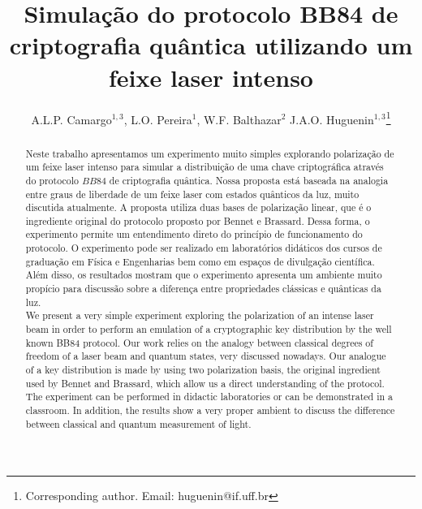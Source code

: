 \documentclass[pra, twocolumn]{revtex4}
\begin{document}
\title{Simula\c{c}\~ao do protocolo BB84 de criptografia qu\^antica utilizando um feixe laser intenso}

\author{A.L.P. Camargo$^{1,3}$, L.O. Pereira$^{1}$, W.F. Balthazar$^{2}$ J.A.O. Huguenin$^{1,3}$\footnote{Corresponding author. Email: huguenin@if.uff.br}}






\begin{abstract}

Neste trabalho apresentamos um experimento muito simples explorando polariza\c{c}\~ao de um feixe laser intenso para simular a distribui\c{c}\~ao de uma chave criptogr\'afica atrav\'es do protocolo $BB84$ de criptografia qu\^antica. Nossa proposta est\'a baseada na analogia entre graus de liberdade de um feixe laser com estados qu\^anticos da luz, muito discutida atualmente. A proposta utiliza duas bases de polariza\c{c}\~ao linear, que \'e o ingrediente original do protocolo proposto por Bennet e Brassard. Dessa forma, o experimento permite um entendimento direto do princ\'ipio de funcionamento do protocolo. O experimento pode ser realizado em laborat\'orios did\'aticos dos cursos de gradua\c{c}\~ao em F\'isica e Engenharias bem como em espa\c{c}os de divulga\c{c}\~ao cient\'ifica. Al\'em disso, os resultados mostram que o experimento apresenta um ambiente muito prop\'icio para discuss\~ao sobre a diferen\c{c}a entre propriedades cl\'assicas e qu\^anticas da luz.\\


We present a very simple experiment exploring the polarization of an intense laser beam in order to perform an emulation of a cryptographic key distribution by the well known BB84 protocol. Our work relies on the analogy between classical degrees of freedom of a laser beam and quantum states, very discussed nowadays. Our analogue of a key distribution is made by using two polarization basis, the original ingredient used by Bennet and Brassard, which allow us a direct understanding of the protocol. The experiment can be performed in didactic laboratories or can be demonstrated in a classroom. In addition, the results show a very proper ambient to discuss the difference between classical and quantum measurement of light.

\end{abstract}
\end{document}
